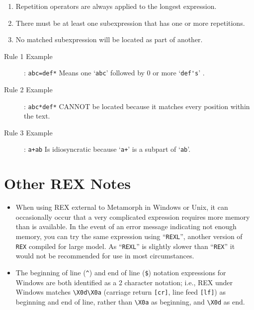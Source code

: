 \begin{enumerate}

\item Repetition operators are always applied to the longest
expression.

\item There must be at least one subexpression that has one or more
repetitions.

\item No matched subexpression will be located as part of another.

\end{enumerate}

\begin{description}
\item[Rule 1 Example]:
\verb`abc=def*`  Means one `\verb`abc`' followed by 0 or more `\verb`def's`' .

\item[Rule 2 Example]:
\verb`abc*def*`  CANNOT be located because it matches every position within the text.

\item[Rule 3 Example]:
\verb`a+ab`  Is idiosyncratic because `\verb`a+`' is a subpart of `\verb`ab`'.
\end{description}

\section{Other REX Notes}

\begin{itemize}

\item When using REX external to Metamorph in Windows or Unix, it can
occasionally occur that a very complicated expression requires more
memory than is available.  In the event of an error message indicating
not enough memory, you can try the same expression using
``\verb`REXL`'', another version of \verb`REX` compiled for large
model.  As ``\verb`REXL`'' is slightly slower than ``\verb`REX`'' it
would not be recommended for use in most circumstances.

\item The beginning of line (\verb`^`) and end of line (\verb`$`)
notation expressions for Windows are both identified as a 2 character
notation; i.e., REX under Windows matches \verb`\X0d\X0a` (carriage
return \verb`[cr]`, line feed \verb`[lf]`) as beginning and end of
line, rather than \verb`\X0a` as beginning, and \verb`\X0d` as end.

\end{itemize}
